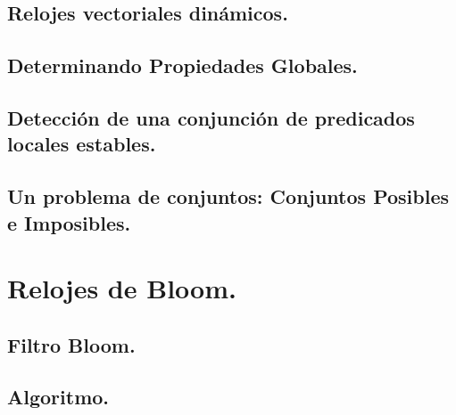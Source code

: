 \documentclass[9pt]{beamer}
\begin{document}
\subsection{Relojes vectoriales dinámicos.}   %



\subsection{Determinando Propiedades Globales.}





\subsection{Detección de una conjunción de predicados locales estables.}


\subsection{Un problema de conjuntos: Conjuntos Posibles e Imposibles.}



\section{Relojes de Bloom.}
\subsection{Filtro Bloom.}



\subsection{Algoritmo.}



\end{document}
